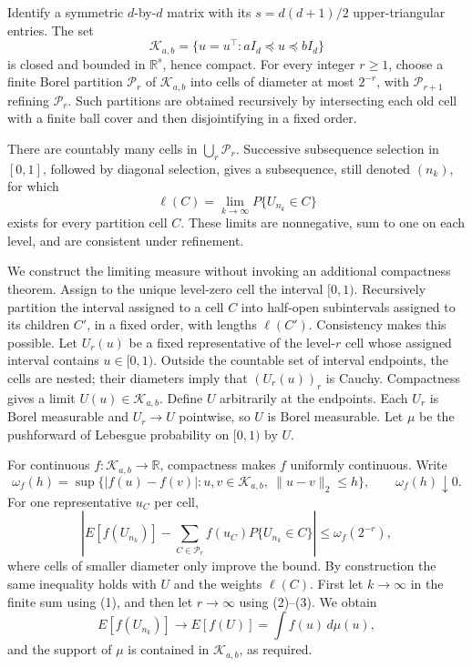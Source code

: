Identify a symmetric \(d\)-by-\(d\) matrix with its
\(s=d(d+1)/2\) upper-triangular entries.  The set
\[
 \mathcal K_{a,b}=\{u=u^\top:aI_d\preceq u\preceq bI_d\}
\]
is closed and bounded in \(\mathbb R^s\), hence compact.  For every integer
\(r\ge1\), choose a finite Borel partition \(\mathcal P_r\) of
\(\mathcal K_{a,b}\) into cells of diameter at most \(2^{-r}\), with
\(\mathcal P_{r+1}\) refining \(\mathcal P_r\).  Such partitions are obtained
recursively by intersecting each old cell with a finite ball cover and then
disjointifying in a fixed order.

There are countably many cells in \(\bigcup_r\mathcal P_r\).  Successive
subsequence selection in \([0,1]\), followed by diagonal selection, gives a
subsequence, still denoted \((n_k)\), for which
\[
 \ell(C)=\lim_{k\to\infty}P\{U_{n_k}\in C\}
\tag{1}
\]
exists for every partition cell \(C\).  These limits are nonnegative, sum to
one on each level, and are consistent under refinement.

We construct the limiting measure without invoking an additional compactness
theorem.  Assign to the unique level-zero cell the interval \([0,1)\).
Recursively partition the interval assigned to a cell \(C\) into half-open
subintervals assigned to its children \(C'\), in a fixed order, with lengths
\(\ell(C')\).  Consistency makes this possible.  Let \(U_r(u)\) be a fixed
representative of the level-\(r\) cell whose assigned interval contains
\(u\in[0,1)\).  Outside the countable set of interval endpoints, the cells
are nested; their diameters imply that \((U_r(u))_r\) is Cauchy.  Compactness
gives a limit \(U(u)\in\mathcal K_{a,b}\).  Define \(U\) arbitrarily at the
endpoints.  Each \(U_r\) is Borel measurable and \(U_r\to U\) pointwise, so
\(U\) is Borel measurable.  Let \(\mu\) be the pushforward of Lebesgue
probability on \([0,1)\) by \(U\).

For continuous \(f:\mathcal K_{a,b}\to\mathbb R\), compactness makes \(f\)
uniformly continuous.  Write
\[
 \omega_f(h)=\sup\{|f(u)-f(v)|:u,v\in\mathcal K_{a,b},\ \|u-v\|_2\le h\},
 \qquad \omega_f(h)\downarrow0.
\tag{2}
\]
For one representative \(u_C\) per cell,
\[
 \left|E[f(U_{n_k})]-\sum_{C\in\mathcal P_r}
 f(u_C)P\{U_{n_k}\in C\}\right|\le\omega_f(2^{-r}),
\tag{3}
\]
where cells of smaller diameter only improve the bound.  By construction the
same inequality holds with \(U\) and the weights \(\ell(C)\).  First let
\(k\to\infty\) in the finite sum using (1), and then let \(r\to\infty\) using
(2)--(3).  We obtain
\[
 E[f(U_{n_k})]\longrightarrow E[f(U)]=\int f(u)\,d\mu(u),
\]
and the support of \(\mu\) is contained in \(\mathcal K_{a,b}\), as required.
